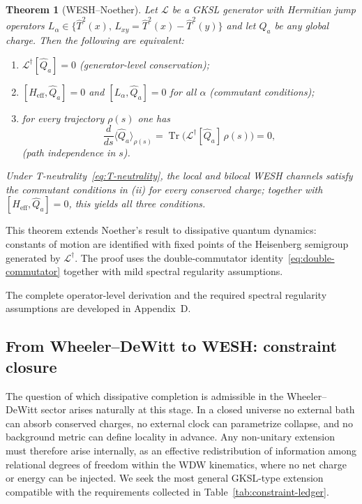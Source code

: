 \documentclass[12pt,a4paper]{article}
\newtheorem{theorem}{Theorem}[section]
\renewcommand{\Tr}{\operatorname{Tr}}
\numberwithin{equation}{section}
\begin{document}
\begin{theorem}[WESH--Noether]
\label{thm:wesh-noether}
Let $\mathcal{L}$ be a GKSL generator with Hermitian jump operators 
$L_\alpha \in \{\hat{T}^2(x),\, L_{xy} = \hat{T}^2(x) - \hat{T}^2(y)\}$ 
and let $\hat{Q}_a$ be any global charge. Then the following are equivalent:
\begin{enumerate}[label=(\roman*)]
\item $\mathcal{L}^\dagger[\hat{Q}_a] = 0$ \quad (generator-level conservation);
\item $[H_{\mathrm{eff}}, \hat{Q}_a] = 0$ and $[L_\alpha, \hat{Q}_a] = 0$ 
for all $\alpha$ \quad (commutant conditions);
\item for every trajectory $\rho(s)$ one has
\begin{equation}
\frac{d}{ds}\langle\hat{Q}_a\rangle_{\rho(s)} 
= \Tr\bigl(\mathcal{L}^\dagger[\hat{Q}_a]\,\rho(s)\bigr) = 0,
\label{eq:charge-conservation}
\end{equation}
\quad (path independence in $s$).
\end{enumerate}
Under T-neutrality~\eqref{eq:T-neutrality}, the local and bilocal WESH
channels satisfy the commutant conditions in \emph{(ii)} for every conserved
charge; together with $[H_{\mathrm{eff}}, \hat{Q}_a]=0$, this yields all
three conditions.
\end{theorem}

\noindent This theorem extends Noether's result to dissipative quantum dynamics:
constants of motion are identified with fixed points of the Heisenberg
semigroup generated by $\mathcal L^\dagger$. The proof uses the 
double-commutator identity~\eqref{eq:double-commutator} together with
mild spectral regularity assumptions.

\vspace{0.3cm}

\noindent The complete operator-level derivation and the required spectral
regularity assumptions are developed in Appendix~D.

\vspace{0.8cm}

\subsection{From Wheeler--DeWitt to WESH: constraint closure}
\label{sec:constraint-closure}

\vspace{0.3cm}

The question of which dissipative completion is admissible in the Wheeler--DeWitt sector arises naturally at this stage. In a closed universe no external bath can absorb conserved charges, no external clock can parametrize collapse, and no background metric can define locality in advance. Any non-unitary extension must therefore arise internally, as an effective redistribution of information among relational degrees of freedom within the WDW kinematics, where no net charge or energy can be injected. We seek the most general GKSL-type extension compatible with the requirements collected in Table~\ref{tab:constraint-ledger}.
\end{document}

